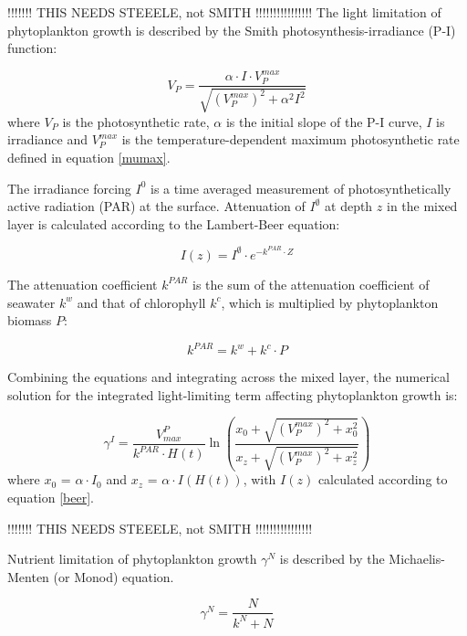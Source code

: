 \documentclass[template.tex]{subfiles}
\begin{document}
!!!!!!! THIS NEEDS STEEELE, not SMITH !!!!!!!!!!!!!!!!
The light limitation of phytoplankton growth is described by the Smith photosynthesis-irradiance (P-I) function:

\begin{equation}
    V_P = \frac{\alpha \cdot I \cdot V^{max}_P}{\sqrt{(V^{max}_P)^2 + \alpha^2 I^2}}
\end{equation}
where $V_P$ is the photosynthetic rate, $\alpha$ is the initial slope of the P-I curve, $I$ is irradiance and $V^{max}_P$ is the temperature-dependent maximum photosynthetic rate defined in equation \eqref{mumax}.


The irradiance forcing $I^0$ is a time averaged measurement of photosynthetically active radiation (PAR) at the surface. Attenuation of $I^\emptyset$ at depth $z$ in the mixed layer is calculated according to the Lambert-Beer equation:

\begin{equation}
    I(z) = I^\emptyset \cdot e^{-k^{PAR} \cdot Z} \label{beer}
\end{equation}

The attenuation coefficient $k^{PAR}$ is the sum of the attenuation coefficient of seawater $k^w$ and that of chlorophyll $k^c$, which is multiplied by phytoplankton biomass $P$:

\begin{equation}
    k^{PAR} = k^w + k^c \cdot P
\end{equation}

Combining the equations and integrating across the mixed layer, the numerical solution for the integrated light-limiting term affecting phytoplankton growth is:

\begin{equation}
    \gamma^I = \frac{V^P_{max}}{k^{PAR} \cdot H(t)} \ln{ \left( \frac{ x_0+\sqrt{(V^{max}_P)^2+x_0^2} }{ x_z+\sqrt{(V^{max}_P)^2+x_z^2} } \right)}
\end{equation}
where $x_0$ = $\alpha \cdot I_0$ and $x_z$ = $\alpha \cdot I(H(t))$, with $I(z)$ calculated according to equation \eqref{beer}.

!!!!!!! THIS NEEDS STEEELE, not SMITH !!!!!!!!!!!!!!!!

Nutrient limitation of phytoplankton growth $\gamma^N$ is described by the Michaelis-Menten (or Monod) equation.

\begin{equation}
    \gamma^N = \frac{N}{k^N + N}
\end{equation}
\end{document}
